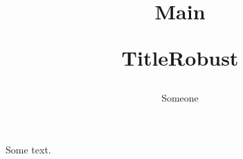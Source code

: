 \documentclass{scrreprt}
\title{Main\par Title\br Robust}
\author{Someone}
\begin{document}
\maketitle
Some text.
\end{document}
